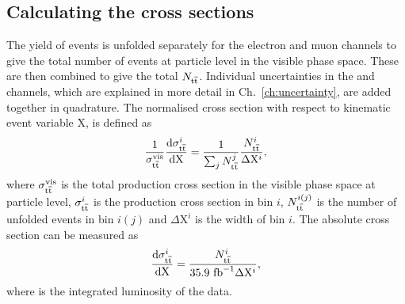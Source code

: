 
\subsection{Calculating the cross sections}

The yield of \ttbar{} events is unfolded separately for the electron and muon channels
to give the total number of events at particle level in the visible phase space.
These are then combined to give the total $N_{\mathrm{t}\overline{\mathrm{t}}}$.
Individual uncertainties in the \eJets{} and \muJets{} channels, which are explained in more detail in Ch.~\ref{ch:uncertainty}, are added together in quadrature.
The normalised cross section with respect to kinematic event variable $\mathrm{X}$, is defined as
\begin{equation}
	\frac{1}{\sigma_{\mathrm{t}\overline{\mathrm{t}}}^{\mathrm{vis}}}\frac{\mathrm{d}\sigma_{\mathrm{t}\overline{\mathrm{t}}}^{i}}{\mathrm{dX}} = \frac{1}{\sum_{j}N_{\mathrm{t}\overline{\mathrm{t}}}^{j}}\frac{N_{\mathrm{t}\overline{\mathrm{t}}}^{i}}{\Delta \mathrm{X}^i},
\end{equation}
where $\sigma_{\mathrm{t}\overline{\mathrm{t}}}^{\mathrm{vis}}$ is the total \ttbar{} production cross section in the visible phase space at particle level, $\sigma_{\mathrm{t}\overline{\mathrm{t}}}^{i}$ is the \ttbar{} production cross section in bin $i$, $N_{\mathrm{t}\overline{\mathrm{t}}}^{i(j)}$ is the number of unfolded \ttbar{} events in bin $i(j)$ and $\Delta \mathrm{X}^i$ is the width of bin $i$.
The absolute cross section can be measured as
\begin{equation}
	\frac{\mathrm{d}\sigma_{\mathrm{t}\overline{\mathrm{t}}}^{i}}{\mathrm{dX}} =\frac{N_{\mathrm{t}\overline{\mathrm{t}}}^{i}}{35.9\mathrm{~fb}^{-1}\Delta \mathrm{X}^i},
\end{equation}
where \Lumi{} is the integrated luminosity of the data.

